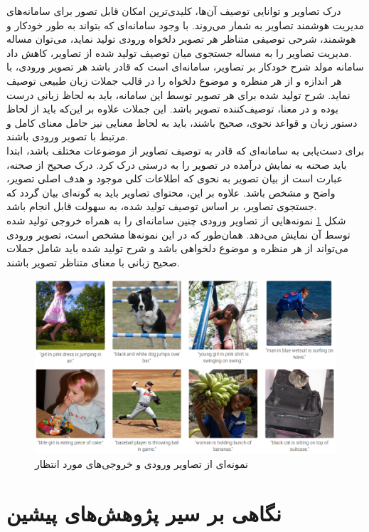 درک تصاویر و توانایی توصیف آن‌ها، کلیدی‌ترین امکان قابل تصور برای سامانه‌های مدیریت هوشمند تصاویر به شمار می‌روند. با وجود سامانه‌ای که بتواند به طور خودکار و هوشمند، شرحی توصیفی متناظر هر تصویر دلخواه ورودی تولید نماید، می‌توان مساله مدیریت تصاویر را به مساله جستجوی میان توصیف تولید شده از تصاویر، کاهش داد. 
\\
سامانه مولد شرح خودکار بر تصاویر، سامانه‌ای است که قادر باشد هر تصویر ورودی، با هر اندازه و از هر منظره و موضوع دلخواه را در قالب جملات زبان طبیعی توصیف نماید. شرح تولید شده برای هر تصویر توسط این سامانه، باید به لحاظ زبانی درست بوده و در معنا، توصیف‌کننده تصویر باشد. این جملات علاوه بر این‌که باید از لحاظ دستور زبان و قواعد نحوی،‌ صحیح باشند، باید به لحاظ معنایی نیز حامل معنای کامل و مرتبط با تصویر ورودی باشند.
\\
برای دست‌یابی به سامانه‌ای که قادر به توصیف تصاویر از موضوعات مختلف باشد، ابتدا باید صحنه به نمایش درآمده در تصویر را به درستی درک کرد. درک صحیح از صحنه، عبارت است از بیان تصویر به نحوی که اطلاعات کلی موجود و هدف اصلی تصویر، واضح و مشخص باشد. علاوه بر این، محتوای تصاویر باید به گونه‌ای بیان گردد که جستجوی تصاویر، بر اساس توصیف تولید شده، به سهولت قابل انجام باشد. 
\\
شکل \ref{fig:smpl} نمونه‌هایی از تصاویر ورودی چنین سامانه‌ای را به همراه خروجی تولید شده توسط آن نمایش می‌دهد. همان‌طور که در این نمونه‌ها مشخص است، تصویر ورودی می‌تواند از هر منظره و موضوع دلخواهی باشد و شرح تولید شده باید شامل جملات صحیح زبانی با معنای متناظر تصویر باشند.
\begin{figure}[h]
	\centering
	\includegraphics[scale=0.3]{Imgs/CaptionSamples.png}
	\caption{نمونه‌ای از تصاویر ورودی و خروجی‌های مورد انتظار}
	\label{fig:smpl}
\end{figure}

\section{نگاهی بر سیر پژوهش‌های پیشین}

